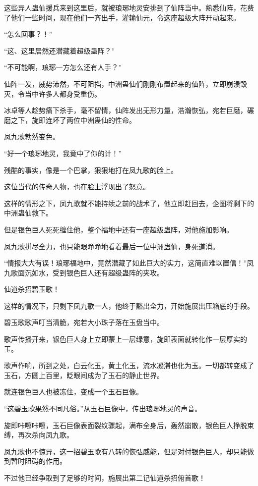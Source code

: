 \begin{this_body}
这些异人蛊仙援兵来到这里后，就被琅琊地灵安排到了仙阵当中。熟悉仙阵，花费了他们一些时间，现在他们一齐出手，灌输仙元，令这座超级大阵开动起来。

“怎么回事？！”

“这、这里居然还潜藏着超级蛊阵？”

“不可能啊，琅琊一方怎么还有人手？”

仙阵一发，威势沛然，不可阻挡，中洲蛊仙们刚刚布置起来的仙阵，立即崩溃毁灭，令当中许多人都身受重伤。

冰卓等人趁势痛下杀手，毫不留情，仙阵发出无形力量，浩瀚恢弘，宛若巨磨，碾磨之下，旋即连坏了两位中洲蛊仙的性命。

凤九歌勃然变色。

“好一个琅琊地灵，我竟中了你的计！”

残酷的事实，像是一个巴掌，狠狠地打在凤九歌的脸上。

这位当代的传奇人物，也在脸上浮现出了怒意。

这样的情形之下，凤九歌就不能持续之前的战术了，他立即赶回去，企图将剩下的中洲蛊仙救下。

但是银色巨人死死缠住他，整个福地中还有一座超级蛊阵，对他施加影响。

凤九歌拼尽全力，也只能眼睁睁地看着最后一位中洲蛊仙，身死道消。

“情报大大有误！琅琊福地中，竟然潜藏了如此巨大的实力，这简直难以置信！”凤九歌面沉如水，受到银色巨人还有超级蛊阵的夹攻。

仙道杀招碧玉歌！

这样的情况下，只剩下凤九歌一人，他终于豁出全力，开始施展出压箱底的手段。

碧玉歌歌声叮当清脆，宛若大小珠子落在玉盘当中。

歌声传播开来，银色巨人身上立即蒙上一层绿意，旋即表面就转化作一层厚实的玉。

歌声作响，所到之处，白云化玉，黄土化玉，流水凝滞也化为玉。一切都转变成了玉石，方圆上百里，眨眼间成为了玉石的静止世界。

就连银色巨人也被冻住，变成一个玉石巨像。

“这碧玉歌果然不同凡俗。”从玉石巨像中，传出琅琊地灵的声音。

旋即咔嚓咔嚓，玉石巨像表面裂纹骤起，满布全身后，轰然崩散，银色巨人挣脱束缚，再次杀向凤九歌。

凤九歌也不惊异，这一招碧玉歌有八转的恢弘威能，但是对付银色巨人，却只能做到暂时阻碍的作用。

不过他已经争取到了足够的时间，施展出第二记仙道杀招俯首歌！


\end{this_body}
